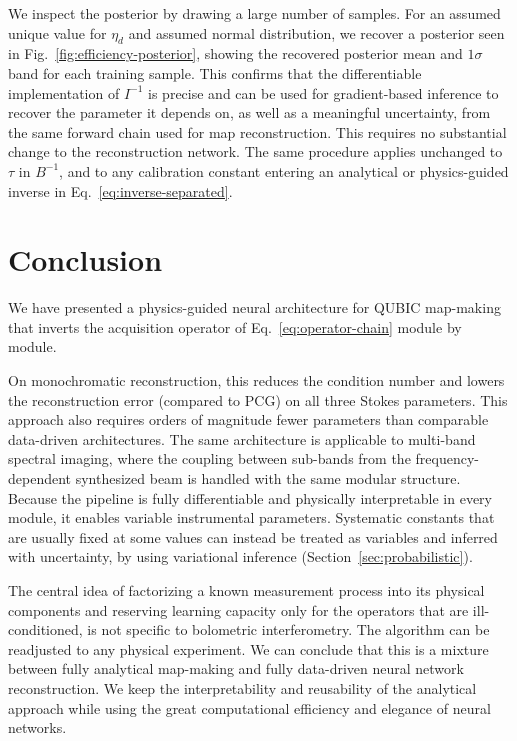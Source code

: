 \documentclass[a4paper,11pt]{article}
\begin{document}
We inspect the posterior by drawing a large number of samples. For an assumed unique value for $\eta_d$ and assumed normal distribution, we recover a posterior seen in Fig.~\ref{fig:efficiency-posterior}, showing the recovered posterior mean and $1\sigma$ band for each training sample. This confirms that the differentiable implementation of $I^{-1}$ is precise and can be used for gradient-based inference to recover the parameter it depends on, as well as a meaningful uncertainty, from the same forward chain used for map reconstruction. This requires no substantial change to the reconstruction network. The same procedure applies unchanged to $\tau$ in $B^{-1}$, and to any calibration constant entering an analytical or physics-guided inverse in Eq.~\ref{eq:inverse-separated}.

\section{Conclusion}
\label{sec:conclusion}

We have presented a physics-guided neural architecture for QUBIC map-making that inverts the acquisition operator of Eq.~\ref{eq:operator-chain} module by module.

On monochromatic reconstruction, this reduces the condition number and lowers the reconstruction error (compared to PCG) on all three Stokes parameters. This approach also requires orders of magnitude fewer parameters than comparable data-driven architectures. The same architecture is applicable to multi-band spectral imaging, where the coupling between sub-bands from the frequency-dependent synthesized beam is handled with the same modular structure. Because the pipeline is fully differentiable and physically interpretable in every module, it enables variable instrumental parameters. Systematic constants that are usually fixed at some values can instead be treated as variables and inferred with  uncertainty, by using variational inference (Section~\ref{sec:probabilistic}).

The central idea of factorizing a known measurement process into its physical components and reserving learning capacity only for the operators that are ill-conditioned, is not specific to bolometric interferometry. The algorithm can be readjusted to any physical experiment.  We can conclude that this is a mixture between fully analytical map-making and fully data-driven neural network reconstruction. We keep the interpretability and reusability of the analytical approach while using the great computational efficiency and elegance of neural networks.
\end{document}
